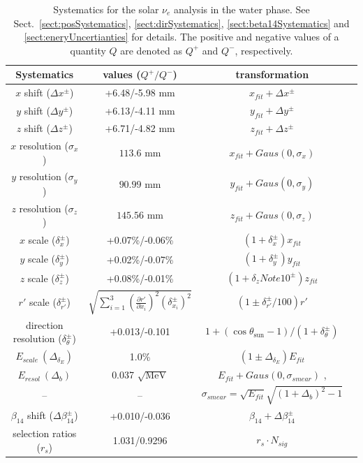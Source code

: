 \begin{table}[ht]
	\centering
\caption{Systematics for the solar $\nu_e$ analysis in the water phase. See Sect.~\ref{sect:posSystematics}, \ref{sect:dirSystematics}, \ref{sect:beta14Systematics} and \ref{sect:eneryUncertianties} for details. The positive and negative values of a quantity $Q$ are denoted as $Q^+$ and $Q^-$, respectively.\label{tab:solar_uncertainties}}
	\vspace{2mm}
	\begin{tabular*}{148mm}{c@{\extracolsep{\fill}}ccc}
		\toprule
		Systematics & values ($Q^+/Q^-$) & transformation   \\
		\hline
		$x$ shift ($\Delta x^\pm$) & +6.48/-5.98 mm  & $x_{fit}+\Delta x^\pm$ \\	
		$y$ shift ($\Delta y^\pm$)& +6.13/-4.11 mm   & $y_{fit}+\Delta y^\pm$ \\
		$z$ shift ($\Delta z^\pm$)& +6.71/-4.82 mm   & $z_{fit}+\Delta z^\pm$ \\
		$x$ resolution ($\sigma_{x}$) & $113.6$ mm& $x_{fit}+Gaus(0,\sigma_{x})$\\	
		$y$ resolution ($\sigma_{y}$) & $90.99$ mm& $y_{fit}+Gaus(0,\sigma_{y})$\\
		$z$ resolution ($\sigma_{z}$) & $145.56$ mm& $z_{fit}+Gaus(0,\sigma_{z})$\\
		$x$ scale ($\delta_x^{\pm}$)& +0.07\%/-0.06\%  & $(1+\delta_x^{\pm})x_{fit}$\\	
		$y$ scale ($\delta_y^{\pm}$)& +0.02\%/-0.07\%  & $(1+\delta_y^{\pm})y_{fit}$ \\
		$z$ scale ($\delta_z^{\pm}$)& +0.08\%/-0.01\%  & $(1+\delta_zNote 10^{\pm})z_{fit}$ \\
		$r'$ scale ($\delta_{r'}^{\pm}$)&  $\sqrt{\sum_{i=1}^3(\frac{\partial r'}{\partial x_i})^2({\delta^{\pm}_{x_i}})^2}$    & $(1\pm\delta^{\pm}_{r'}/100)r'$\\
		direction resolution ($\delta_\theta^{\pm}$)  & +0.013/-0.101 & $1+(\cos\theta_\mathrm{sun}-1)/(1+\delta_\theta^{\pm})$\\
		$E_{scale}~(\Delta_{\delta_E})$ &  1.0\%  & $(1\pm \Delta_{\delta_E})E_{fit}$\\
		$E_{resol}~(\Delta_b)$ &  0.037 $\sqrt{\mathrm{MeV}}$  & $E_{fit}+Gaus(0,\sigma_{smear})$ , \\
		-- & -- &$\sigma_{smear}=\sqrt{E_{fit}}\sqrt{(1+\Delta_b)^2-1}$\\
		$\beta_{14}$ shift ($\Delta \beta_{14}^\pm$) & +0.010/-0.036 & $\beta_{14}+\Delta \beta_{14}^\pm$\\
		selection ratios ($r_s$) & 1.031/0.9296 & $r_s\cdot N_{sig}$\\
		\bottomrule
	\end{tabular*}
\end{table}

